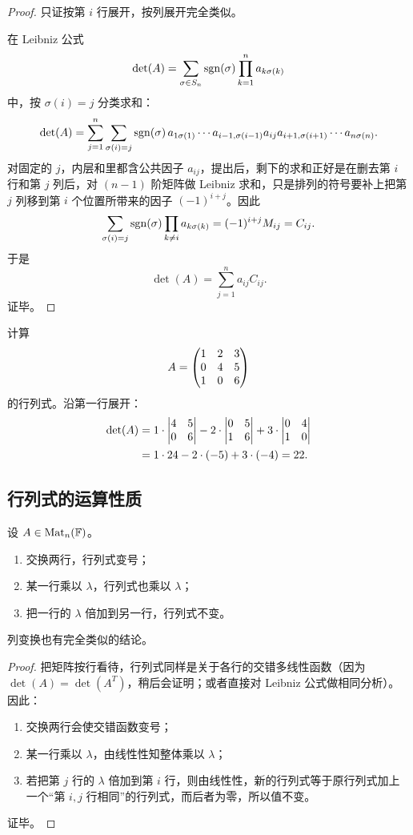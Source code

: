 \begin{proof}
只证按第 $i$ 行展开，按列展开完全类似。

在 Leibniz 公式
\[
\det(A)=\sum_{\sigma\in S_n}\operatorname{sgn}(\sigma)\prod_{k=1}^n a_{k\sigma(k)}
\]
中，按 $\sigma(i)=j$ 分类求和：
\[
\det(A)=\sum_{j=1}^n\sum_{\sigma(i)=j}\operatorname{sgn}(\sigma)\,a_{1\sigma(1)}\cdots a_{i-1,\sigma(i-1)}a_{ij}a_{i+1,\sigma(i+1)}\cdots a_{n\sigma(n)}.
\]
对固定的 $j$，内层和里都含公共因子 $a_{ij}$，提出后，剩下的求和正好是在删去第 $i$ 行和第 $j$ 列后，对 $(n-1)$ 阶矩阵做 Leibniz 求和，只是排列的符号要补上把第 $j$ 列移到第 $i$ 个位置所带来的因子 $(-1)^{i+j}$。因此
\[
\sum_{\sigma(i)=j}\operatorname{sgn}(\sigma)\prod_{k\ne i}a_{k\sigma(k)}=(-1)^{i+j}M_{ij}=C_{ij}.
\]
于是
\[
\det(A)=\sum_{j=1}^n a_{ij}C_{ij}.
\]
证毕。
\end{proof}

\begin{example}
计算
\[
A=\begin{pmatrix} 1&2&3\\0&4&5\\1&0&6 \end{pmatrix}
\]
的行列式。沿第一行展开：
\begin{align*}
\det(A)
&=1\cdot\begin{vmatrix} 4&5\\0&6 \end{vmatrix}-2\cdot\begin{vmatrix} 0&5\\1&6 \end{vmatrix}+3\cdot\begin{vmatrix} 0&4\\1&0 \end{vmatrix}\\
&=1\cdot 24-2\cdot(-5)+3\cdot(-4)=22.
\end{align*}
\end{example}

\subsection{行列式的运算性质}

\begin{proposition}[对初等行变换的反应]
设 $A\in\mathrm{Mat}_n(\mathbb{F})$。
\begin{enumerate}[label=(\arabic*)]
  \item 交换两行，行列式变号；
  \item 某一行乘以 $\lambda$，行列式也乘以 $\lambda$；
  \item 把一行的 $\lambda$ 倍加到另一行，行列式不变。
\end{enumerate}
列变换也有完全类似的结论。
\end{proposition}

\begin{proof}
把矩阵按行看待，行列式同样是关于各行的交错多线性函数（因为 $\det(A)=\det(A^T)$，稍后会证明；或者直接对 Leibniz 公式做相同分析）。因此：
\begin{enumerate}[label=(\arabic*)]
  \item 交换两行会使交错函数变号；
  \item 某一行乘以 $\lambda$，由线性性知整体乘以 $\lambda$；
  \item 若把第 $j$ 行的 $\lambda$ 倍加到第 $i$ 行，则由线性性，新的行列式等于原行列式加上一个“第 $i,j$ 行相同”的行列式，而后者为零，所以值不变。
\end{enumerate}
证毕。
\end{proof}

